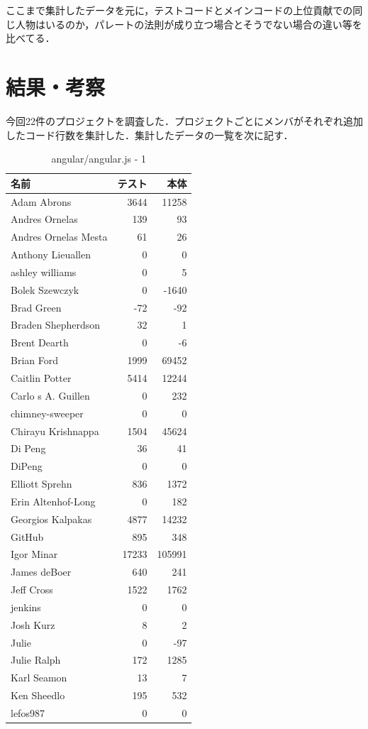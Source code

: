 ここまで集計したデータを元に，テストコードとメインコードの上位貢献での同じ人物はいるのか，パレートの法則が成り立つ場合とそうでない場合の違い等を比べてる．



\chapter{結果・考察}

今回22件のプロジェクトを調査した．プロジェクトごとにメンバがそれぞれ追加したコード行数を集計した．集計したデータの一覧を次に記す．

\begin{table}[htb]
\begin{center}
\caption{angular/angular.js - 1}
\begin{tabular}{|l|r|r|} \hline 
名前 & テスト & 本体 \\ \hline \hline
Adam Abrons & 3644 & 11258 \\ \hline
Andres Ornelas & 139 & 93 \\ \hline
Andres Ornelas Mesta & 61 & 26 \\ \hline
Anthony Lieuallen & 0 & 0 \\ \hline
ashley williams & 0 & 5 \\ \hline
Bolek Szewczyk & 0 & -1640 \\ \hline
Brad Green & -72 & -92 \\ \hline
Braden Shepherdson & 32 & 1 \\ \hline
Brent Dearth & 0 & -6 \\ \hline
Brian Ford & 1999 & 69452 \\ \hline
Caitlin Potter & 5414 & 12244 \\ \hline
Carlo s A. Guillen & 0 & 232 \\ \hline
chimney-sweeper & 0 & 0 \\ \hline
Chirayu Krishnappa & 1504 & 45624 \\ \hline
Di Peng & 36 & 41 \\ \hline
DiPeng & 0 & 0 \\ \hline
Elliott Sprehn & 836 & 1372 \\ \hline
Erin Altenhof-Long & 0 & 182 \\ \hline
Georgios Kalpakas & 4877 & 14232 \\ \hline
GitHub & 895 & 348 \\ \hline
Igor Minar & 17233 & 105991 \\ \hline
James deBoer & 640 & 241 \\ \hline
Jeff Cross & 1522 & 1762 \\ \hline
jenkins & 0 & 0 \\ \hline
Josh Kurz & 8 & 2 \\ \hline
Julie & 0 & -97 \\ \hline
Julie Ralph & 172 & 1285 \\ \hline
Karl Seamon & 13 & 7 \\ \hline
Ken Sheedlo & 195 & 532 \\ \hline
lefos987 & 0 & 0 \\ \hline
\end{tabular}
\end{center}
\end{table}

